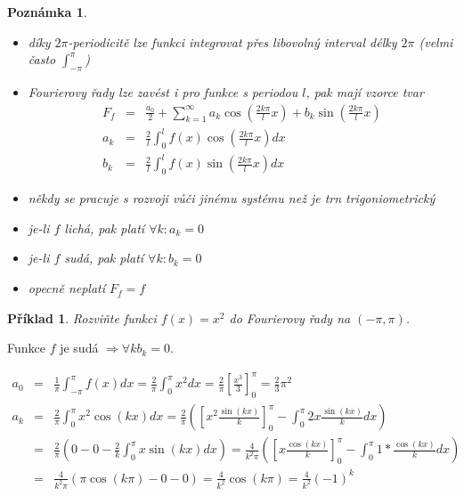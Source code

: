 \documentclass[11pt,a4paper]{article}
\newtheorem*{poznamka}{Poznámka}
\newtheorem*{priklad}{Příklad}
\begin{document}
\begin{poznamka}
\begin{itemize} \quad
\item díky $2 \pi$-periodicitě lze funkci integrovat přes libovolný interval délky $2 \pi$ (velmi často $\int_{-\pi}^{\pi}$)
\item Fourierovy řady lze zavést i pro funkce s periodou $l$, pak mají vzorce tvar
\begin{eqnarray}
F_f & = & \frac{a_0}{2} + \sum_{k=1}^{\infty} a_k \cos \left( \frac{2 k \pi}{l} x \right) + b_k \sin \left( \frac{2 k \pi}{l} x \right) \nonumber\\
a_k & = & \frac{2}{l} \int_0^{l} f(x) \cos \left( \frac{2 k \pi}{l} x \right) dx \nonumber\\
b_k & = & \frac{2}{l} \int_0^l f(x) \sin \left( \frac{2 k \pi}{l} x \right) dx \nonumber
\end{eqnarray}
\item někdy se pracuje s rozvoji vůči jinému systému než je trn trigoniometrický
\item je-li $f$ lichá, pak platí $\forall k : a_k = 0$
\item je-li $f$ sudá, pak platí $\forall k : b_k = 0$
\item opecně neplatí $F_f = f$
\end{itemize}
\end{poznamka}

\begin{priklad}
Rozviňte funkci $f(x) = x^2$ do Fourierovy řady na $(-\pi, \pi)$.
\end{priklad}

Funkce $f$ je sudá $\Rightarrow \forall k b_k = 0$.

\begin{eqnarray}
a_0 & = & \frac{1}{\pi} \int_{-\pi}^{\pi} f(x) dx = \frac{2}{\pi} \int_0^{\pi} x^2 dx = \frac{2}{\pi} \left[ \frac{x^3}{3} \right]_0^\pi = \frac{2}{3} \pi^2 \nonumber\\
a_k & = & \frac{2}{\pi} \int_{0}^{\pi} x^2 \cos (kx) dx = \frac{2}{\pi} \left( \left[x^2 \frac{\sin (kx)}{k} \right]_0^\pi - \int_0^\pi 2x \frac{\sin (kx)}{k} dx \right) \nonumber\\
& = & \frac{2}{\pi} \left( 0 - 0 - \frac{2}{k} \int_0^\pi x \sin (kx) dx \right) = \frac{4}{k^2 \pi} \left( \left[ x \frac{\cos (kx)}{k} \right]_0^\pi - \int_0^\pi 1 * \frac{\cos(kx)}{k} dx \right) \nonumber\\
& = & \frac{4}{k^2 \pi} \left( \pi \cos (k \pi) - 0 - 0 \right) = \frac{4}{k^2} \cos (k \pi) = \frac{4}{k^2} (-1)^k \nonumber
\end{eqnarray}
\end{document}

